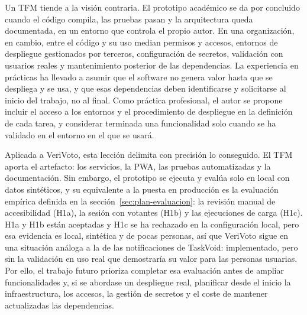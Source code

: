 Un TFM tiende a la visión contraria. El prototipo académico se da por
concluido cuando el código compila, las pruebas pasan y la arquitectura queda
documentada, en un entorno que controla el propio autor. En una organización,
en cambio, entre el código y su uso median permisos y accesos, entornos de
despliegue gestionados por terceros, configuración de secretos, validación con
usuarios reales y mantenimiento posterior de las dependencias. La experiencia
en prácticas ha llevado a asumir que el software no genera valor hasta que se
despliega y se usa, y que esas dependencias deben identificarse y solicitarse
al inicio del trabajo, no al final. Como práctica profesional, el autor se
propone incluir el acceso a los entornos y el procedimiento de despliegue en la
definición de cada tarea, y considerar terminada una funcionalidad solo cuando
se ha validado en el entorno en el que se usará.

Aplicada a VeriVoto, esta lección delimita con precisión lo conseguido. El TFM
aporta el artefacto: los servicios, la PWA, las pruebas automatizadas y la
documentación. Sin embargo, el prototipo se ejecuta y evalúa solo en local con
datos sintéticos, y su equivalente a la puesta en producción es la evaluación
empírica definida en la sección~\ref{sec:plan-evaluacion}: la revisión manual
de accesibilidad (H1a), la sesión con votantes (H1b) y las ejecuciones de
carga (H1c). H1a y H1b están aceptadas y H1c se ha rechazado en la configuración local, pero
esa evidencia es local, sintética y de pocas personas, así que VeriVoto sigue en una situación
análoga a la de las notificaciones de TaskVoid: implementado, pero sin la
validación en uso real que demostraría su valor para las personas usuarias. Por ello, el
trabajo futuro prioriza completar esa evaluación antes de ampliar
funcionalidades y, si se abordase un despliegue real, planificar desde el
inicio la infraestructura, los accesos, la gestión de secretos y el coste de
mantener actualizadas las dependencias.

